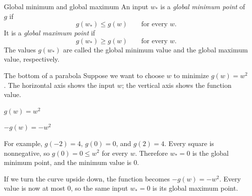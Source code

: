 \documentclass[a4paper,12pt,oneside]{report}
\begin{document}
\begin{frameddefn}{Global minimum and global maximum}\label{def:global-optimum}
An input $w_*$ is a \emph{global minimum point} of $g$ if
\[
  g(w_*)\leq g(w)\qquad\text{for every }w.
\]
It is a \emph{global maximum point} if
\[
  g(w_*)\geq g(w)\qquad\text{for every }w.
\]
The values $g(w_*)$ are called the global minimum value and the
global maximum value, respectively.
\end{frameddefn}

\begin{framedexample}{The bottom of a parabola}
Suppose we want to choose $w$ to minimize $g(w)=w^2$. The horizontal
axis shows the input $w$; the vertical axis shows the function value.

\begin{center}
\begin{minipage}[t]{0.48\linewidth}
\centering
$g(w)=w^2$\par\smallskip
{}
\end{minipage}\hfill
\begin{minipage}[t]{0.48\linewidth}
\centering
$-g(w)=-w^2$\par\smallskip
{}
\end{minipage}
\end{center}

For example, $g(-2)=4$, $g(0)=0$, and $g(2)=4$.
Every square is nonnegative, so $g(0)=0\leq w^2$ for every $w$.
Therefore $w_*=0$ is the global minimum point, and the minimum value
is $0$.

If we turn the curve upside down, the function becomes $-g(w)=-w^2$.
Every value is now at most $0$, so the same input $w_*=0$ is its
global maximum point.
\end{framedexample}
\end{document}
